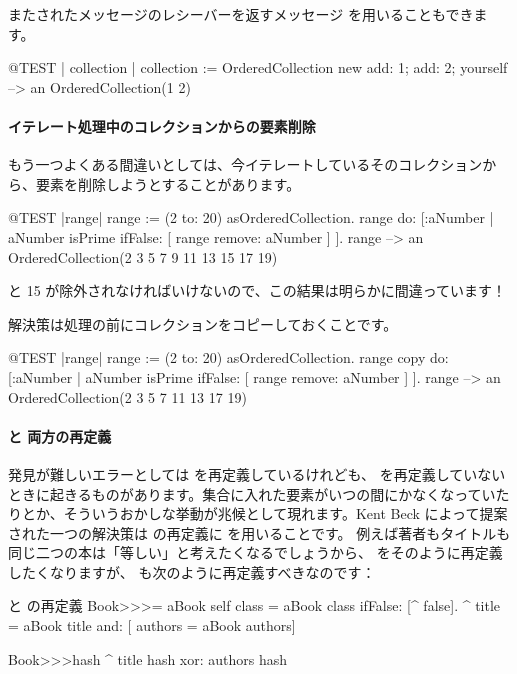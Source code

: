 \documentclass[a4paper,10pt,twoside]{book}
\begin{document}
またされたメッセージのレシーバーを返すメッセージ  を用いることもできます。

\begin{code}{@TEST | collection |}
collection := OrderedCollection new add: 1; add: 2; yourself --> an OrderedCollection(1 2)
\end{code}

\paragraph{イテレート処理中のコレクションからの要素削除} もう一つよくある間違いとしては、今イテレートしているそのコレクションから、要素を削除しようとすることがあります。
\begin{code}{@TEST |range|}
range := (2 to: 20) asOrderedCollection.
range do: [:aNumber | aNumber isPrime ifFalse: [ range remove: aNumber ] ].
range --> an OrderedCollection(2 3 5 7 9 11 13 15 17 19)
\end{code}
 と 15 が除外されなければいけないので、この結果は明らかに間違っています！

解決策は処理の前にコレクションをコピーしておくことです。
\begin{code}{@TEST |range|}
range := (2 to: 20) asOrderedCollection.
range copy do: [:aNumber | aNumber isPrime ifFalse: [ range remove: aNumber ] ].
range --> an OrderedCollection(2 3 5 7 11 13 17 19)
\end{code}

\paragraph{\ct{=} と  両方の再定義}
発見が難しいエラーとしては \ct{=} を再定義しているけれども、 を再定義していないときに起きるものがあります。集合に入れた要素がいつの間にかなくなっていたりとか、そういうおかしな挙動が兆候として現れます。Kent Beck によって提案された一つの解決策は  の再定義に  を用いることです。
例えば著者もタイトルも同じ二つの本は「等しい」と考えたくなるでしょうから、\ct{=} をそのように再定義したくなりますが、 も次のように再定義すべきなのです：

\begin{method}{\lct{=} と  の再定義}
Book>>>= aBook
   self class = aBook class ifFalse: [^ false].
   ^ title = aBook title and: [ authors = aBook authors]

Book>>>hash 
   ^ title hash xor: authors hash
\end{method}
\end{document}
